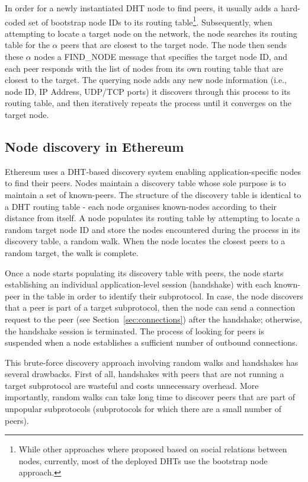 In order for a newly instantiated DHT node to find peers, it usually adds a hard-coded set of bootstrap node IDs to its routing table\footnote{While other approaches where proposed based on social relations between nodes, currently, most of the deployed DHTs use the bootstrap node approach.}. Subsequently, when attempting to locate a target node on the network, the node searches its routing table for the $\alpha$ peers that are closest to the target node. The node then sends these $\alpha$ nodes a FIND\_NODE message that specifies the target node ID, and each peer responds with the list of nodes from its own routing table that are closest to the target. The querying node adds any new node information (i.e., node ID, IP Address, UDP/TCP ports) it discovers through this process to its routing table, and then iteratively repeats the process until it converges on the target node.
 

\subsection{Node discovery in Ethereum}
Ethereum uses a DHT-based discovery system enabling application-specific nodes to find their peers. Nodes maintain a discovery table whose sole purpose is to maintain a set of known-peers. The structure of the discovery table is identical to a DHT routing table - each node organises known-nodes according to their distance from itself. A node populates its routing table by attempting to locate a random target node ID and store the nodes encountered during the process in its discovery table, \ie a random walk. When the node locates the closest peers to a random target, the walk is complete. 

Once a node starts populating its discovery table with peers, the node starts establishing an individual application-level session (\ie handshake) with each known-peer in the table in order to identify their subprotocol. In case, the node discovers that a peer is part of a target subprotocol, then the node can send a connection request to the peer (see Section~\ref{sec:connections}) after the handshake; otherwise, the handshake session is terminated. The process of looking for peers is suspended when a node establishes a sufficient number of outbound connections.

This brute-force discovery approach involving random walks and handshakes has several drawbacks. First of all, handshakes with peers that are not running a target subprotocol are wasteful and costs unnecessary overhead. More importantly, random walks can take long time to discover peers that are part of unpopular subprotocols (\ie subprotocols for which there are a small number of peers). 

